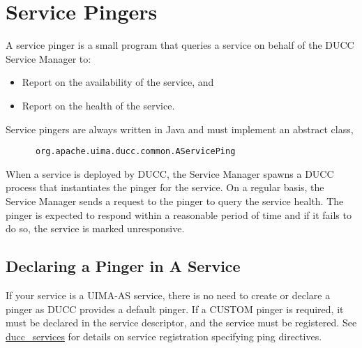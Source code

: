       \section{Service Pingers}
      \label{sec:service.pingers}
      A service pinger is a small program that queries a service on behalf of the
      DUCC Service Manager to:
      \begin{itemize}
        \item Report on the availability of the service, and
        \item Report on the health of the service.
      \end{itemize}
      
      Service pingers are always written in Java and must implement an abstract class,
\begin{verbatim}
      org.apache.uima.ducc.common.AServicePing
\end{verbatim}
      When a service is deployed by
      DUCC, the Service Manager spawns a DUCC process that instantiates the pinger for
      the service.  On a regular basis, the Service Manager sends a request to the pinger
      to query the service health.  The pinger is expected to respond within a reasonable
      period of time and if it fails to do so, the service is marked unresponsive.

      \subsection{Declaring a Pinger in A Service}

      If your service is a UIMA-AS service, there is no need to create or declare a pinger as  DUCC
      provides a default pinger.  If a CUSTOM pinger is required, it must be declared in the service
      descriptor, and the service must be registered.  See
      \hyperref[sec:cli.ducc-services]{ducc\_services} for details on service registration specifying
      ping directives.

